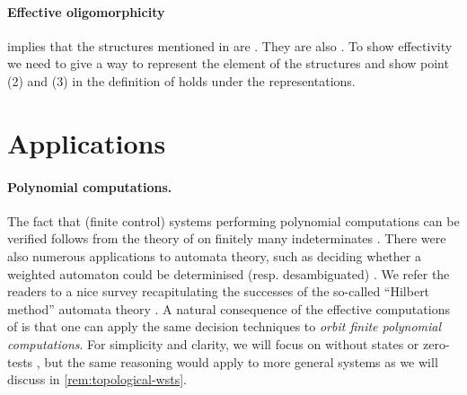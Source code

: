 \paragraph{Effective oligomorphicity}
%
\cite[Theorem 7.6]{BOJAN16inf} implies that the structures mentioned in   are .
They are also .
To show effectivity we need to give a way to represent the element of the structures and show point (2) and (3) in the definition of  holds under the representations.




%

\section{Applications}


\paragraph{Polynomial computations.} \AP The fact that (finite control) systems
performing polynomial computations can be verified follows from the theory of
 on finitely many indeterminates \cite{MULSEI02,BEDUSHWO17}.
There were also numerous applications to automata theory, such as deciding
whether a weighted automaton could be determinised (resp. desambiguated)
\cite{BESM23,PUSM24}. We refer the readers to a nice survey recapitulating the
successes of the so-called ``Hilbert method'' automata theory \cite{BOJAN19}. A
natural consequence of the effective computations of  is that one can apply the same decision techniques to \emph{orbit finite
polynomial computations}. For simplicity and clarity, we will focus on
 without states or zero-tests \cite{BEDUSHWO17}, but
the same reasoning would apply to more general systems as we will discuss in
\cref{rem:topological-wsts}.


